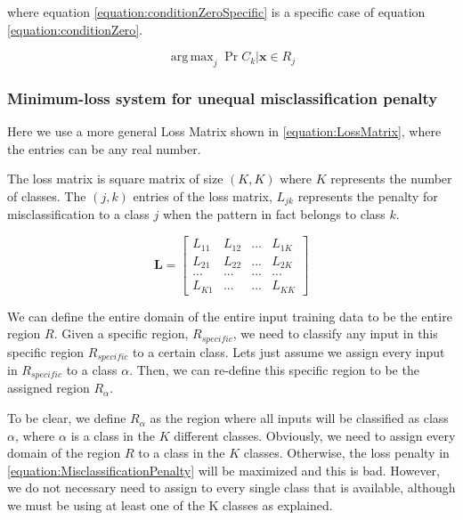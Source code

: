 \documentclass[a4paper,12pt]{article}
\DeclareMathOperator*{\argmax}{arg\,max}
\begin{document}
where equation \ref{equation:conditionZeroSpecific} is a specific case of equation \ref{equation:conditionZero}. 

\begin{equation}
\label{equation:conditionZeroSpecific}
\argmax_j \Pr{C_{k} | \mathbf{x} \in R_{j}} 
\end{equation}

\clearpage
\subsubsection{Minimum-loss system for unequal misclassification penalty}
\label{section:MinimumLossGeneral}

Here we use a more general Loss Matrix shown in \ref{equation:LossMatrix}, where the entries can be any real number.  

The loss matrix is square matrix of size $(K,K)$ where $K$ represents the number of classes. 
The $(j,k)$ entries of the loss matrix, $L_{jk}$ represents the penalty for misclassification to a class $j$ when the pattern in fact belongs to class $k$. 

\begin{equation}
\label{equation:LossMatrix}
\mathbf{L} =
  \begin{bmatrix}
    L_{11} & L_{12} & ... & L_{1K} \\
    L_{21} & L_{22} & ... & L_{2K} \\
    ... & ... & ... & ... \\
    L_{K1} & ... & ... & L_{KK}
  \end{bmatrix}
\end{equation}

We can define the entire domain of the entire input training data to be the entire region $R$. 
Given a specific region, $R_{specific}$, we need to classify any input in this specific region $R_{specific}$ to a certain class. Lets just assume we assign every input in $R_{specific}$  to a class $\alpha$. Then, we can re-define this specific region to be the assigned region $R_{\alpha}$. 

To be clear, we define $R_{\alpha}$ as the region where all inputs will be classified as class $\alpha$, where $\alpha$ is a class in the $K$ different classes.
Obviously, we need to assign every domain of the region $R$ to a class in the $K$ classes. Otherwise, the loss penalty in \ref{equation:MisclassificationPenalty} will be maximized and this is bad. However, we do not necessary need to assign to every single class that is available, although we must be using at least one of the K classes as explained. 
\end{document}
